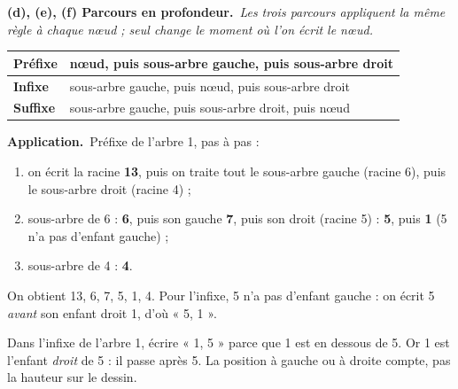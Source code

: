 \documentclass[11pt, a4paper]{exam}
\newcommand{\Qp}[2]{\par\medskip\noindent\textbf{#1}\ \textit{#2}\par\nopagebreak\smallskip}
\newcommand{\application}{\par\noindent\textbf{Application.}\ }
\begin{document}
\Qp{(d), (e), (f) Parcours en profondeur.}{Les trois parcours appliquent la même règle à chaque nœud ; seul change le moment où l'on écrit le nœud.}
\begin{center}
\renewcommand{\arraystretch}{1.25}
\begin{tabular}{|l|l|}
\hline
\textbf{Préfixe} & nœud, puis sous-arbre gauche, puis sous-arbre droit \\ \hline
\textbf{Infixe} & sous-arbre gauche, puis nœud, puis sous-arbre droit \\ \hline
\textbf{Suffixe} & sous-arbre gauche, puis sous-arbre droit, puis nœud \\ \hline
\end{tabular}
\end{center}
\application Préfixe de l'arbre 1, pas à pas :
\begin{enumerate}
\item on écrit la racine \textbf{13}, puis on traite tout le sous-arbre gauche (racine 6), puis le sous-arbre droit (racine 4) ;
\item sous-arbre de 6 : \textbf{6}, puis son gauche \textbf{7}, puis son droit (racine 5) : \textbf{5}, puis \textbf{1} (5 n'a pas d'enfant gauche) ;
\item sous-arbre de 4 : \textbf{4}.
\end{enumerate}
On obtient 13, 6, 7, 5, 1, 4. Pour l'infixe, 5 n'a pas d'enfant gauche : on écrit 5 \emph{avant} son enfant droit 1, d'où « 5, 1 ».
\begin{erreur}
Dans l'infixe de l'arbre 1, écrire « 1, 5 » parce que 1 est en dessous de 5. Or 1 est l'enfant \emph{droit} de 5 : il passe après 5. La position à gauche ou à droite compte, pas la hauteur sur le dessin.
\end{erreur}
\end{document}
